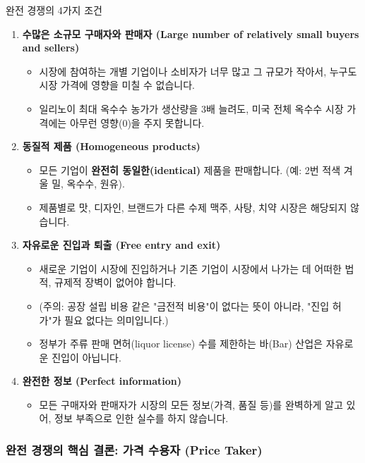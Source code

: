 \documentclass[11pt,a4paper]{article}
\theoremstyle{definition}
\begin{document}
\begin{mybox}{완전 경쟁의 4가지 조건}
\begin{enumerate}
    \item \textbf{수많은 소규모 구매자와 판매자 (Large number of relatively small buyers and sellers)}
    \begin{itemize}
        \item 시장에 참여하는 개별 기업이나 소비자가 너무 많고 그 규모가 작아서, 누구도 시장 가격에 영향을 미칠 수 없습니다.
        \item [예시 👍] 일리노이 최대 옥수수 농가가 생산량을 3배 늘려도, 미국 전체 옥수수 시장 가격에는 아무런 영향(0)을 주지 못합니다.
    \end{itemize}
    \item \textbf{동질적 제품 (Homogeneous products)}
    \begin{itemize}
        \item 모든 기업이 \textbf{완전히 동일한(identical)} 제품을 판매합니다. (예: 2번 적색 겨울 밀, 옥수수, 원유).
        \item [나쁜 예 👎] 제품별로 맛, 디자인, 브랜드가 다른 수제 맥주, 사탕, 치약 시장은 해당되지 않습니다.
    \end{itemize}
    \item \textbf{자유로운 진입과 퇴출 (Free entry and exit)}
    \begin{itemize}
        \item 새로운 기업이 시장에 진입하거나 기존 기업이 시장에서 나가는 데 어떠한 법적, 규제적 장벽이 없어야 합니다.
        \item (주의: 공장 설립 비용 같은 "금전적 비용"이 없다는 뜻이 아니라, "진입 허가"가 필요 없다는 의미입니다.)
        \item [나쁜 예 👎] 정부가 주류 판매 면허(liquor license) 수를 제한하는 바(Bar) 산업은 자유로운 진입이 아닙니다.
    \end{itemize}
    \item \textbf{완전한 정보 (Perfect information)}
    \begin{itemize}
        \item 모든 구매자와 판매자가 시장의 모든 정보(가격, 품질 등)를 완벽하게 알고 있어, 정보 부족으로 인한 실수를 하지 않습니다.
    \end{itemize}
\end{enumerate}
\end{mybox}

\subsubsection{완전 경쟁의 핵심 결론: 가격 수용자 (Price Taker)}
\end{document}
